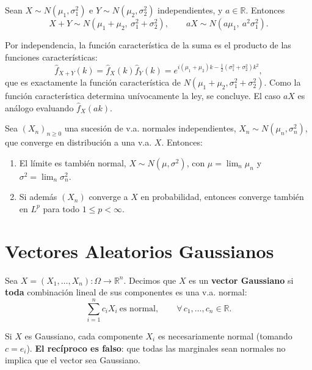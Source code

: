 \begin{teo}
Sean $X\sim N(\mu_1,\sigma_1^2)$ e $Y\sim N(\mu_2,\sigma_2^2)$ independientes, y $a\in\mathbb{R}$. Entonces
\[
X+Y \sim N(\mu_1+\mu_2,\ \sigma_1^2+\sigma_2^2), \qquad aX \sim N(a\mu_1,\ a^2\sigma_1^2).
\]
\end{teo}
\begin{observacion}
Por independencia, la función característica de la suma es el producto de las funciones características:
\[
\hat{f}_{X+Y}(k) = \hat{f}_X(k)\hat{f}_Y(k) = e^{i(\mu_1+\mu_2)k - \frac{1}{2}(\sigma_1^2+\sigma_2^2)k^2},
\]
que es exactamente la función característica de $N(\mu_1+\mu_2,\sigma_1^2+\sigma_2^2)$. Como la función característica determina unívocamente la ley, se concluye. El caso $aX$ es análogo evaluando $\hat{f}_X(ak)$.
\end{observacion}

\begin{prop}
Sea $(X_n)_{n\ge0}$ una sucesión de v.a. normales independientes, $X_n\sim N(\mu_n,\sigma_n^2)$, que converge en distribución a una v.a. $X$. Entonces:
\begin{enumerate}
    \item El límite es también normal, $X\sim N(\mu,\sigma^2)$, con $\mu=\lim_n \mu_n$ y $\sigma^2 = \lim_n \sigma_n^2$.
    \item Si además $(X_n)$ converge a $X$ en probabilidad, entonces converge también en $L^p$ para todo $1\le p<\infty$.
\end{enumerate}
\end{prop}

\section{Vectores Aleatorios Gaussianos}

\begin{definicion}
Sea $X=(X_1,\dots,X_n):\Omega\to\mathbb{R}^n$. Decimos que $X$ es un \textbf{vector Gaussiano} si \textbf{toda} combinación lineal de sus componentes es una v.a. normal:
\[
\sum_{i=1}^n c_i X_i \ \text{es normal}, \qquad \forall\, c_1,\dots,c_n\in\mathbb{R}.
\]
\end{definicion}

\begin{observacion}
Si $X$ es Gaussiano, cada componente $X_i$ es necesariamente normal (tomando $c=e_i$). \textbf{El recíproco es falso}: que todas las marginales sean normales no implica que el vector sea Gaussiano.
\end{observacion}

